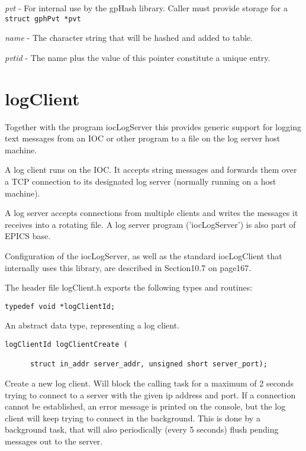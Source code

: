 \begin{description}\item \emph{pvt} - For internal use by the gpHash library. Caller must provide storage for a \verb|struct gphPvt *pvt|

\item \emph{name} - The character string that will be hashed and added to table.

\item \emph{pvtid} - The name plus the value of this pointer constitute a unique entry.

\end{description}\section{logClient}

Together with the program iocLogServer this provides generic support for logging text messages from an IOC or other 
program to a file on the log server host machine.

A log client runs on the IOC. It accepts string messages and forwards them over a TCP connection to its designated log 
server (normally running on a host machine).

A log server accepts connections from multiple clients and writes the messages it receives into a rotating file. A log server 
program ('iocLogServer') is also part of EPICS base.

Configuration of the iocLogServer, as well as the standard iocLogClient that internally uses this library, are described in 
Section10.7 on page167.

The header file logClient.h exports the following types and routines:

\begin{verbatim}typedef void *logClientId;
\end{verbatim}    An abstract data type, representing a log client.

\begin{verbatim}logClientId logClientCreate (

      struct in_addr server_addr, unsigned short server_port);
\end{verbatim}    Create a new log client. Will block the calling task for a maximum of 2 seconds trying to connect to a server with the 
given ip address and port. If a connection cannot be established, an error message is printed on the console, but the log 
client will keep trying to connect in the background. This is done by a background task, that will also periodically (every 
5 seconds) flush pending messages out to the server.

